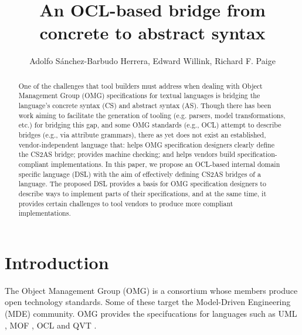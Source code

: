 \documentclass{llncs}
\begin{document}
\title{An OCL-based bridge from concrete to abstract syntax}

\author{Adolfo S\'{a}nchez-Barbudo Herrera, Edward Willink,
Richard F. Paige}

\maketitle

\begin{abstract}
One of the challenges that tool builders must address when dealing with Object Management Group (OMG) specifications for textual languages is bridging the language's concrete syntax (CS) and abstract syntax (AS). Though there has been work aiming to facilitate the generation of tooling (e.g. parsers, model transformations, etc.) for bridging this gap, and some OMG standards (e.g., OCL) attempt to describe bridges (e.g., via attribute grammars), there as yet does not exist an established, vendor-independent language that: helps OMG specification designers clearly define the CS2AS bridge; provides machine checking; and helps vendors build specification-compliant implementations. In this paper, we propose an OCL-based internal domain specific language (DSL) with the aim of effectively defining CS2AS bridges of a language. The proposed DSL provides a basis for OMG specification designers to describe ways to implement parts of their specifications, and at the same time, it provides certain challenges to tool vendors to produce more compliant implementations. %
\end{abstract}

\section{Introduction}

The Object Management Group (OMG) is a consortium whose members produce open technology standards. Some of these target the Model-Driven Engineering (MDE) community. OMG provides the specifucations for languages such as UML \cite{omg2012uml}, MOF \cite{omg2013mof}, OCL \cite{omg2013ocl} and QVT \cite{omg2014qvt}.
\end{document}
